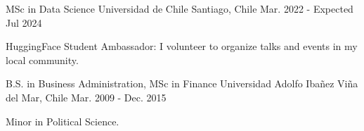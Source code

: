 

\begin{cventries}


  \cventry
    {MSc in Data Science} %
    {Universidad de Chile} %
    {Santiago, Chile} %
    {Mar. 2022 - Expected Jul 2024} %
    {
      \begin{cvitems} %
	\item {HuggingFace Student Ambassador: I volunteer to organize talks and
events in  my local community.}
      \end{cvitems}
    }
    
  \cventry
    {B.S. in Business Administration, MSc in Finance} %
    {Universidad Adolfo Ibañez} %
    {Viña del Mar, Chile} %
    {Mar. 2009 - Dec. 2015} %
    {
      \begin{cvitems} %
        \item {Minor in Political Science.}
      \end{cvitems}
    }

\end{cventries}
